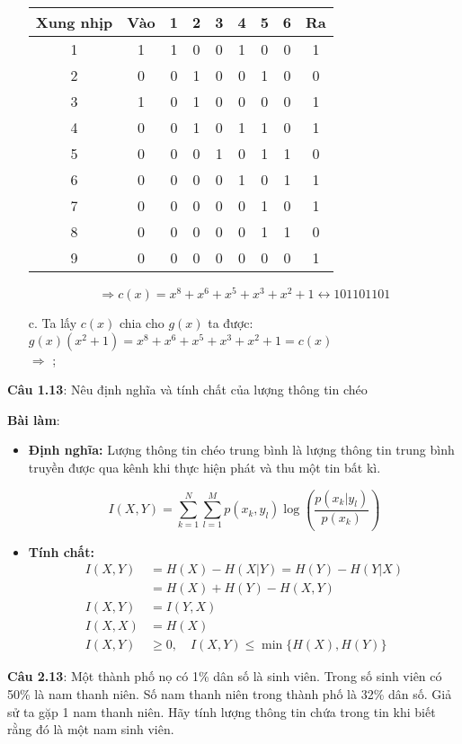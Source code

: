 \documentclass[12pt]{article}
\begin{document}
\begin{itemize}
    \begin{center}
    \begin{tabular}{|c|c|c|c|c|c|c|c|c|}
    \hline
    \textbf{Xung nhịp} & \textbf{Vào} & \textbf{1} & \textbf{2} & \textbf{3} & \textbf{4} & \textbf{5} & \textbf{6} & \textbf{Ra} \\
    \hline
    1 & 1 & 1 & 0 & 0 & 1 & 0 & 0 & 1 \\
    \hline
    2 & 0 & 0 & 1 & 0 & 0 & 1 & 0 & 0 \\
    \hline
    3 & 1 & 0 & 1 & 0 & 0 & 0 & 0 & 1 \\
    \hline
    4 & 0 & 0 & 1 & 0 & 1 & 1 & 0 & 1 \\
    \hline
    5 & 0 & 0 & 0 & 1 & 0 & 1 & 1 & 0 \\
    \hline
    6 & 0 & 0 & 0 & 0 & 1 & 0 & 1 & 1 \\
    \hline
    7 & 0 & 0 & 0 & 0 & 0 & 1 & 0 & 1 \\
    \hline
    8 & 0 & 0 & 0 & 0 & 0 & 1 & 1 & 0 \\
    \hline
    9 & 0 & 0 & 0 & 0 & 0 & 0 & 0 & 1 \\
    \hline
    \end{tabular}
    \end{center}
    \[
    \Rightarrow c(x) = x^8 + x^6 + x^5 + x^3 + x^2 + 1  \leftrightarrow  101101101 \]
    \item[c.] Ta lấy $c(x)$ chia cho $g(x)$ ta được: \\
    $g(x)(x^2 +1) = x^8 + x^6 + x^5 + x^3 + x^2 + 1 = c(x) $\\
    $\Rightarrow$ ;
    
    

\end{itemize}

\newpage
\textbf{Câu 1.13}: Nêu định nghĩa và tính chất của lượng thông tin chéo 

\textbf{Bài làm}: 
\begin{itemize}
    \item \textbf{Định nghĩa:} Lượng thông tin chéo trung bình là lượng thông tin trung bình truyền được qua kênh khi thực hiện phát và thu một tin bất kì.
    
    \[
    I(X, Y) = \sum_{k=1}^N \sum_{l=1}^M p(x_k, y_l) \log\left(\frac{p(x_k|y_l)}{p(x_k)}\right)
    \]
    
    \item \textbf{Tính chất:}
    \[
   \begin{aligned}
    I(X, Y) &= H(X) - H(X|Y) = H(Y) - H(Y|X) \\
            &= H(X) + H(Y) - H(X, Y) \\
    I(X, Y) &= I(Y, X) \\
    I(X, X) &= H(X) \\
    I(X, Y) &\geq 0,\quad I(X, Y) \leq \min\{H(X), H(Y)\}
\end{aligned}
    \]
\end{itemize}
\textbf{Câu 2.13}: Một thành phố nọ có 1\% dân số là sinh viên. Trong số sinh viên có 50\% là nam thanh niên. Số nam thanh niên trong thành phố là 32\% dân số. Giả sử ta gặp 1 nam thanh niên. Hãy tính lượng thông tin chứa trong tin khi biết rằng đó là một nam sinh viên.
\end{document}
